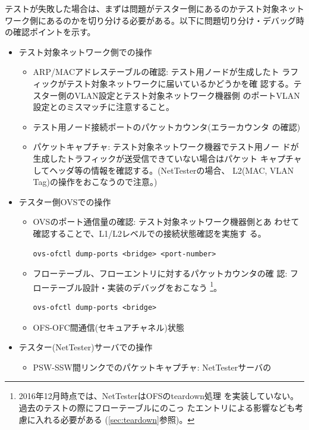 テストが失敗した場合は、まずは問題がテスター側にあるのかテスト対象ネット
ワーク側にあるのかを切り分ける必要がある。以下に問題切り分け・デバッグ時
の確認ポイントを示す。
\begin{itemize}
 \item テスト対象ネットワーク側での操作
       \begin{itemize}
        \item ARP/MACアドレステーブルの確認: テスト用ノードが生成したト
              ラフィックがテスト対象ネットワークに届いているかどうかを確
              認する。テスター側のVLAN設定とテスト対象ネットワーク機器側
              のポートVLAN設定とのミスマッチに注意すること。
        \item テスト用ノード接続ポートのパケットカウンタ(エラーカウンタ
              の確認)
        \item パケットキャプチャ: テスト対象ネットワーク機器でテスト用ノー
              ドが生成したトラフィックが送受信できていない場合はパケット
              キャプチャしてヘッダ等の情報を確認する。(NetTesterの場合、
              L2(MAC, VLAN Tag)の操作をおこなうので注意。)
       \end{itemize}
 \item テスター側OVSでの操作
       \begin{itemize}
        \item OVSのポート通信量の確認: テスト対象ネットワーク機器側とあ
              わせて確認することで、L1/L2レベルでの接続状態確認を実施す
              る。
\begin{lstlisting}
ovs-ofctl dump-ports <bridge> <port-number>
\end{lstlisting}
        \item フローテーブル、フローエントリに対するパケットカウンタの確
              認: フローテーブル設計・実装のデバッグをおこなう
              \footnote{2016年12月時点では、NetTesterはOFSのteardown処理
              を実装していない。過去のテストの際にフローテーブルにのこっ
              たエントリによる影響なども考慮に入れる必要がある
              (\ref{sec:teardown}参照)。}。
\begin{lstlisting}
ovs-ofctl dump-ports <bridge>
\end{lstlisting}
        \item OFS-OFC間通信(セキュアチャネル)状態
       \end{itemize}
 \item テスター(NetTester)サーバでの操作
       \begin{itemize}
        \item PSW-SSW間リンクでのパケットキャプチャ: NetTesterサーバの

\end{itemize}
\end{itemize}

